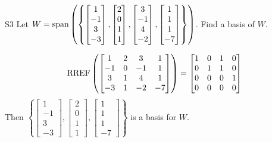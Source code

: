 \begin{problem}{S3}
Let $W={\rm span}\left( \left\{ \begin{bmatrix} 1 \\ -1 \\ 3 \\ -3 \end{bmatrix},\begin{bmatrix} 2 \\ 0 \\ 1 \\ 1 \end{bmatrix}, \begin{bmatrix} 3 \\ -1 \\ 4 \\ -2 \end{bmatrix},  \begin{bmatrix} 1 \\ 1 \\ 1 \\ -7 \end{bmatrix} \right\}\right)$.  Find a basis of $W$.
\end{problem}
\begin{solution}
$$ \operatorname{RREF} \left( \begin{bmatrix} 1 & 2 & 3 & 1 \\ -1 & 0 & -1 & 1 \\ 3 & 1 & 4 & 1 \\ -3 & 1 & -2 & -7 \end{bmatrix} \right) =  \begin{bmatrix} 1 & 0 & 1 & 0 \\ 0 & 1 & 1 & 0 \\ 0 & 0 & 0 & 1 \\ 0 & 0 & 0 & 0\end{bmatrix}$$
Then  $\left\{ \begin{bmatrix} 1 \\ -1 \\ 3 \\ -3 \end{bmatrix},\begin{bmatrix} 2 \\ 0 \\ 1 \\ 1 \end{bmatrix},   \begin{bmatrix} 1 \\ 1 \\ 1 \\ -7 \end{bmatrix} \right\}$ is a basis for $W$.
\end{solution}


